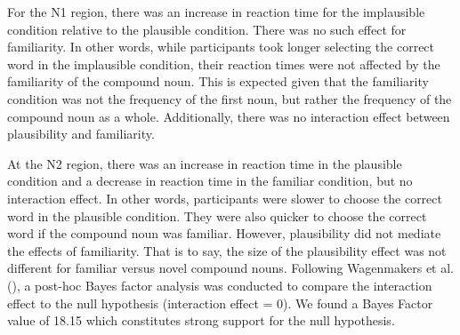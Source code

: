 \documentclass[
  12pt,
  letterpaper,
]{scrreprt}
\begin{document}
For the N1 region, there was an increase in reaction time for the
implausible condition relative to the plausible condition. There was no
such effect for familiarity. In other words, while participants took
longer selecting the correct word in the implausible condition, their
reaction times were not affected by the familiarity of the compound
noun. This is expected given that the familiarity condition was not the
frequency of the first noun, but rather the frequency of the compound
noun as a whole. Additionally, there was no interaction effect between
plausibility and familiarity.

At the N2 region, there was an increase in reaction time in the
plausible condition and a decrease in reaction time in the familiar
condition, but no interaction effect. In other words, participants were
slower to choose the correct word in the plausible condition. They were
also quicker to choose the correct word if the compound noun was
familiar. However, plausibility did not mediate the effects of
familiarity. That is to say, the size of the plausibility effect was not
different for familiar versus novel compound nouns. Following
Wagenmakers et al.
(), a
post-hoc Bayes factor analysis was conducted to compare the interaction
effect to the null hypothesis (interaction effect = 0). We found a Bayes
Factor value of 18.15 which constitutes strong support for the null
hypothesis.
\end{document}
